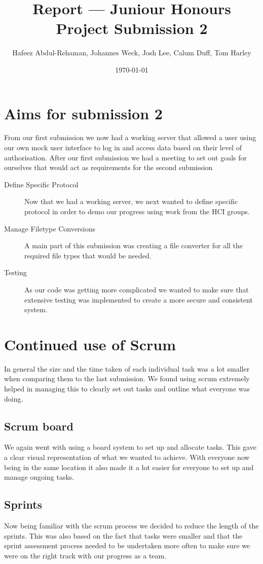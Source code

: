 \documentclass{article}
\begin{document}
\title{Report --- Juniour Honours Project Submission 2}
\author{Hafeez Abdul-Rehaman, Johannes Weck, Josh Lee, Calum Duff, Tom Harley}
\date{\today}

\maketitle

\section{Aims for submission 2}
From our first submission we now had a working server that allowed a user using our own mock user interface to log in and access data based on their level of authorisation. After our first submission we had a meeting to set out goals for ourselves that would act as requirements for the second submission 
\begin{description}
  \item[Define Specific Protocol] Now that we had a working server, we next wanted to define specific protocol in order to demo our progress using work from the HCI groups.
  \item[Manage Filetype Conversions] A main part of this submission was creating a file converter for all the required file types that would be needed. 
  \item[Testing] As our code was getting more complicated we wanted to make sure that extensive testing was implemented to create a more secure and consistent system.
\end{description}

\section{Continued use of Scrum}
In general the size and the time taken of each individual task was a lot smaller when comparing them to the last submission. We found using scrum extremely helped in managing this to clearly set out tasks and outline what everyone was doing. 
\subsection{Scrum board}
We again went with using a board system to set up and allocate tasks. This gave a clear visual representation of what we wanted to achieve. With everyone now being in the same location it also made it a lot easier for everyone to set up and manage ongoing tasks. 
\subsection{Sprints}
Now being familiar with the scrum process we decided to reduce the length of the sprints. This was also based on the fact that tasks were smaller and that the sprint assessment process needed to be undertaken more often to make sure we were on the right track with our progress as a team.
\end{document}
